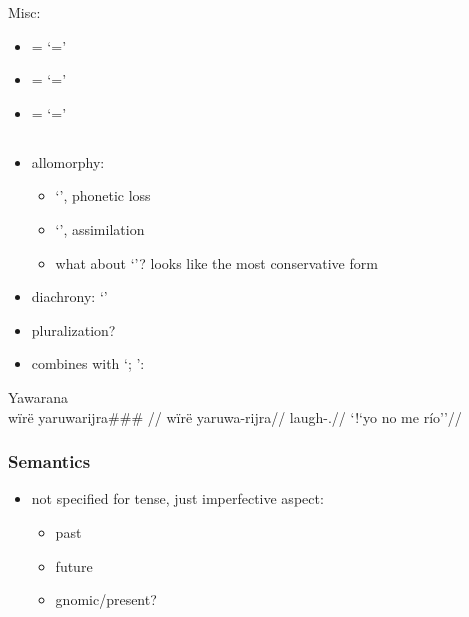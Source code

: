 \documentclass{memoir}
\begin{document}
Misc:

\begin{itemize}
\tightlist
\item
  = `='
\item
  = `='
\item
  = `='
\end{itemize}

\subsection{\texorpdfstring{ \label{sec:riipfv}}{ }}

\begin{itemize}
\tightlist
\item
  allomorphy:

  \begin{itemize}
  \tightlist
  \item
     `', phonetic loss
  \item
     `', assimilation
  \item
    what about  `'? looks like the most conservative
    form
  \end{itemize}
\item
  diachrony:  `'
\item
  pluralization?
\item
  combines with  `; ':
\end{itemize}

\ex Yawarana \\
\label{convrisamaj-4}    \begingl
    \glpreamble wïrë yaruwarijra\#\#\# //
    \gla wïrë yaruwa-rijra//
    \glb {} laugh-.//
        \glft ‘!‘yo no me río’’//  
    \endgl 
\xe

\subsubsection{Semantics}

\begin{itemize}
\tightlist
\item
  not specified for tense, just imperfective aspect:

  \begin{itemize}
  \tightlist
  \item
    past 
  \item
    future 
  \item
    gnomic/present? 
  \end{itemize}
\end{itemize}
\end{document}
